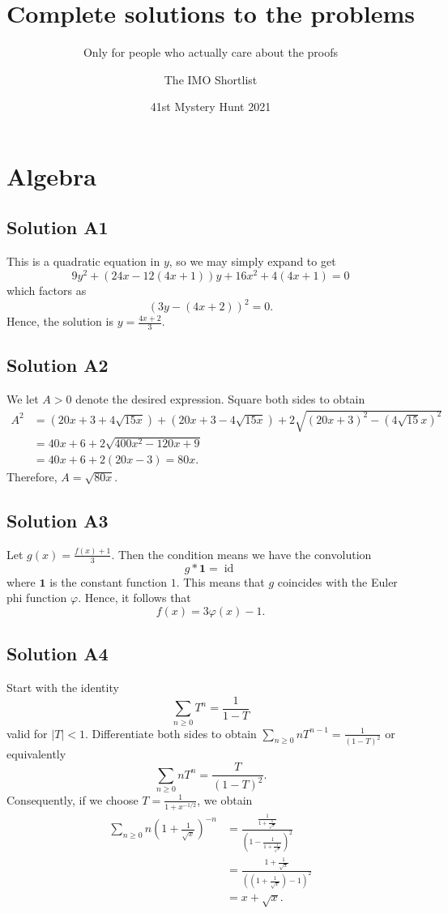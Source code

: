 \documentclass[11pt]{scrartcl}
\begin{document}
\title{Complete solutions to the problems}
\subtitle{Only for people who actually care about the proofs}
\author{The IMO Shortlist}
\date{41st Mystery Hunt 2021}
\maketitle

\section{Algebra}
\subsection*{Solution A1}
This is a quadratic equation in $y$, so we may simply expand to get
\[ 9y^2 + (24x - 12(4x+1)) y + 16x^2+4(4x+1) = 0 \]
which factors as
\[ \left( 3y - (4x+2) \right)^2 = 0. \]
Hence, the solution is $y = \frac{4x+2}{3}$.

\subsection*{Solution A2}
We let $A > 0$ denote the desired expression.
Square both sides to obtain
\begin{align*}
	A^2 &= \left( 20x+3+4\sqrt{15x} \right)
	+ \left( 20x+3-4\sqrt{15x} \right)
	+ 2\sqrt{ (20x+3)^2-(4\sqrt{15}x)^2 } \\
	&= 40x+6 + 2\sqrt{400x^2 - 120x + 9} \\
	&= 40x+6 + 2(20x-3) = 80x.
\end{align*}
Therefore, $A = \sqrt{80x}$.

\subsection*{Solution A3}
Let $g(x) = \frac{f(x)+1}{3}$.
Then the condition means we have the convolution
\[ g \ast \mathbf 1 = \operatorname{id} \]
where $\mathbf 1$ is the constant function $1$.
This means that $g$ coincides with the Euler phi function $\varphi$.
Hence, it follows that \[ f(x) = 3 \varphi(x) - 1. \]

\subsection*{Solution A4}
Start with the identity
\[ \sum_{n \ge 0} T^n = \frac{1}{1-T} \]
valid for $|T| < 1$.
Differentiate both sides to obtain
$\sum_{n \ge 0} n T^{n-1} = \frac{1}{(1-T)^2}$
or equivalently
\[ \sum_{n \ge 0} n T^{n} = \frac{T}{(1-T)^2}. \]
Consequently, if we choose $T = \frac{1}{1+x^{-1/2}}$, we obtain
\begin{align*}
	\sum_{n \ge 0} n \left( 1 + \frac{1}{\sqrt x} \right)^{-n}
	&= \frac{\frac{1}{1+\frac{1}{\sqrt x}}}
	{\left( 1 - \frac{1}{1+\frac{1}{\sqrt x}} \right)^2} \\
	&= \frac{1+\frac{1}{\sqrt x}}
	{\left( \left( 1 + \frac{1}{\sqrt x} \right) - 1 \right)^2} \\
	&= x + \sqrt x.
\end{align*}
\end{document}
